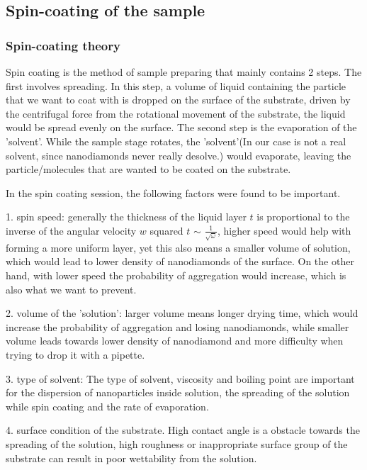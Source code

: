 \subsection{Spin-coating of the sample}
\subsubsection{Spin-coating theory} 
Spin coating is the method of sample preparing that mainly contains 2 steps. The first involves spreading. In this step, a volume of liquid containing the particle that we want to coat with is dropped on the surface of the substrate, driven by the centrifugal force from the rotational movement of the substrate, the liquid would be spread evenly on the surface.
The second step is the evaporation of the 'solvent'. While the sample stage rotates, the 'solvent'(In our case is not a real solvent, since nanodiamonds never really desolve.) would evaporate, leaving the particle/molecules that are wanted to be coated on the substrate.

In the spin coating session, the following factors were found to be important.

1. spin speed: generally the thickness of the liquid layer $t$ is proportional to the inverse of the angular velocity $w$ squared $t$ $\sim$ $\frac{1}{\sqrt{\omega}}$, higher speed would help with forming a more uniform layer, yet this also means a smaller volume of solution, which would lead to lower density of nanodiamonds of the surface. On the other hand, with lower speed the probability of aggregation would increase, which is also what we want to prevent.

2. volume of the 'solution': larger volume means longer drying time, which would increase the probability of aggregation and losing nanodiamonds, while smaller volume leads towards lower density of nanodiamond and more difficulty when trying to drop it with a pipette. 

3. type of solvent: The type of solvent, viscosity and boiling point are important for the dispersion of nanoparticles inside solution, the spreading of the solution while spin coating and the rate of evaporation.

4. surface condition of the substrate. High contact angle is a obstacle towards the spreading of the solution, high roughness or inappropriate surface group of the substrate can result in poor wettability from the solution.



